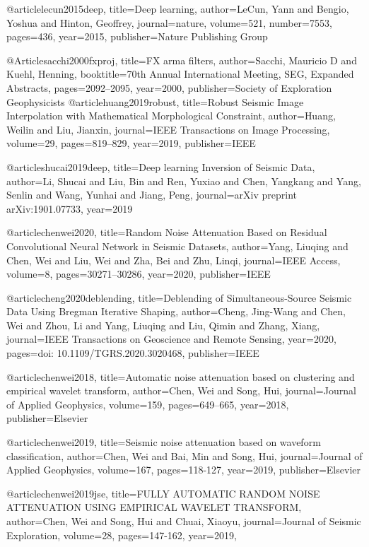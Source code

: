 @article{lecun2015deep,
  title={Deep learning},
  author={LeCun, Yann and Bengio, Yoshua and Hinton, Geoffrey},
  journal={nature},
  volume={521},
  number={7553},
  pages={436},
  year={2015},
  publisher={Nature Publishing Group}
}

@Article{sacchi2000fxproj,
  title={FX arma filters},
  author={Sacchi, Mauricio D and Kuehl, Henning},
  booktitle={70th Annual International Meeting, SEG, Expanded Abstracts},
  pages={2092--2095},
  year={2000},
  publisher={Society of Exploration Geophysicists}
}
@article{huang2019robust,
  title={Robust Seismic Image Interpolation with Mathematical Morphological Constraint},
  author={Huang, Weilin and Liu, Jianxin},
  journal={IEEE Transactions on Image Processing},
  volume={29},
  pages={819--829},
  year={2019},
  publisher={IEEE}
}

@article{shucai2019deep,
  title={Deep learning Inversion of Seismic Data},
  author={Li, Shucai and Liu, Bin and Ren, Yuxiao and Chen, Yangkang and Yang, Senlin and Wang, Yunhai and Jiang, Peng},
  journal={arXiv preprint arXiv:1901.07733},
  year={2019}
}


@article{chenwei2020,
  title={Random Noise Attenuation Based on Residual Convolutional Neural Network in Seismic Datasets},
  author={Yang, Liuqing and Chen, Wei and Liu, Wei and Zha, Bei and Zhu, Linqi},
  journal={IEEE Access},
  volume={8},
  pages={30271--30286},
  year={2020},
  publisher={IEEE}
}

@article{cheng2020deblending,
  title={Deblending of Simultaneous-Source Seismic Data Using Bregman Iterative Shaping},
  author={Cheng, Jing-Wang and Chen, Wei and Zhou, Li and Yang, Liuqing and Liu, Qimin and Zhang, Xiang},
  journal={IEEE Transactions on Geoscience and Remote Sensing},
  year={2020},
  pages={doi: 10.1109/TGRS.2020.3020468},
  publisher={IEEE}
}


@article{chenwei2018,
  title={Automatic noise attenuation based on clustering and empirical wavelet transform},
  author={Chen, Wei and Song, Hui},
  journal={Journal of Applied Geophysics},
  volume={159},
  pages={649--665},
  year={2018},
  publisher={Elsevier}
}

@article{chenwei2019,
  title={Seismic noise attenuation based on waveform classification},
  author={Chen, Wei and Bai, Min and Song, Hui},
  journal={Journal of Applied Geophysics},
  volume={167},
  pages={118-127},
  year={2019},
  publisher={Elsevier}
}



@article{chenwei2019jse,
  title={FULLY AUTOMATIC RANDOM NOISE ATTENUATION USING EMPIRICAL WAVELET TRANSFORM},
  author={Chen, Wei and Song, Hui and Chuai, Xiaoyu},
  journal={Journal of Seismic Exploration},
  volume={28},
  pages={147-162},
  year={2019},
}


